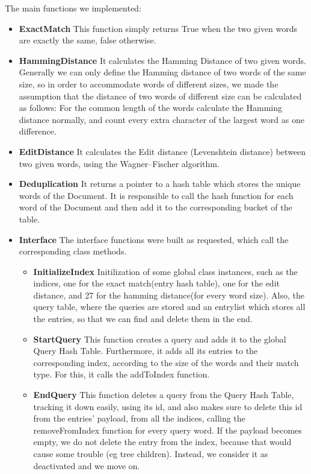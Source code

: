 \documentclass{article}
\begin{document}
The main functions we implemented:
\begin{itemize}
  \item \textbf{ExactMatch}
  This function simply returns True when the two given words are exactly the same, false otherwise.
  \item \textbf{HammingDistance}
  It calculates the Hamming Distance of two given words. Generally we can only define the Hamming distance of two words of the same size, so in order to accommodate words of different sizes, we made the assumption that the distance of two words of different size can be calculated as follows:
  For the common length of the words calculate the Hamming distance normally, and count every extra character of the largest word as one difference.
  \item \textbf{EditDistance}
  It calculates the Edit distance (Levenshtein distance) between two given words, using the Wagner–Fischer algorithm.
  \item \textbf{Deduplication} It returns a pointer to a hash table which stores the unique words of the Document. It is responsible to call the hash function for each word of the Document and then add it to the corresponding bucket of the table.
  \item \textbf{Interface} The interface functions were built as requested, which call the corresponding class methods.
  \begin{itemize}
  \item \textbf{InitializeIndex}
   Initilization of some global class instances, such as the indices, one for the exact  match(entry hash table), one for the edit distance, and 27 for the hamming distance(for every word size). Also, the query table, where the queries are stored and an entrylist which stores all the entries, so that we can find and delete them in the end.
  \item \textbf{StartQuery} 
   This function creates a query and adds it to the global Query Hash Table. Furthermore, it adds all its entries to the corresponding index, according to the size of the words and their match type. For this, it calls the addToIndex function.
  \item \textbf{EndQuery}
   This function deletes a query from the Query Hash Table, tracking it down easily, using its id, and also makes sure to delete this id from the entries' payload, from all the indices, calling the removeFromIndex function for every query word. If the payload becomes empty, we do not delete the entry from the index, because that would cause some trouble (eg tree children). Instead, we consider it as deactivated and we move on.

\end{itemize}
\end{itemize}
\end{document}

